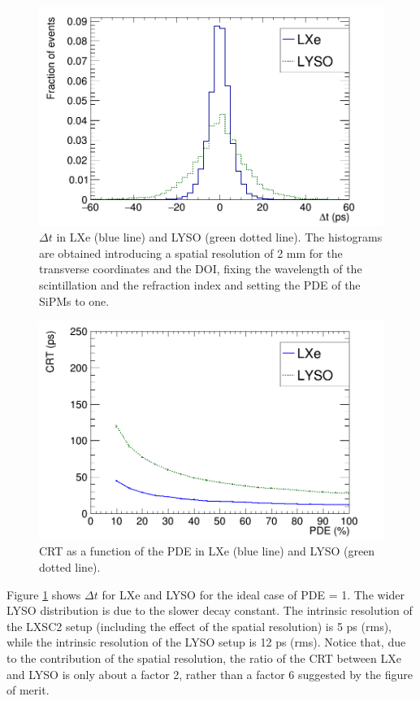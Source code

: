 \documentclass[review]{elsarticle}
\begin{document}
\begin{figure}[!bhtp]
	\centering
	\includegraphics[scale=0.4]{../img/DTOFLXeLYSO.png}
	\caption{\label{fig.dtof} $\Delta t$ in LXe (blue line) and LYSO (green dotted line). The
	histograms are obtained introducing a spatial resolution of 2 mm for the transverse coordinates and
	the DOI, fixing the wavelength of the scintillation and the refraction index and setting the PDE of the SiPMs to one. }
\end{figure}

\begin{figure}[!bhtp]
	\centering
	\includegraphics[scale=0.4]{../img/CRTvsPDELXeLYSONoJitterFstPE.png}
	\caption{\label{fig.crt1} CRT as a function of the PDE in LXe (blue line) and LYSO (green dotted line). }
\end{figure}

 Figure \ref{fig.dtof} shows $\Delta t$ for LXe and LYSO for the ideal case of PDE = 1. The wider LYSO distribution is due to the slower decay constant. The intrinsic resolution of the LXSC2 setup (including the effect of the spatial resolution) is 5 ps (rms), while the
 intrinsic resolution of the LYSO setup is 12 ps (rms). Notice that, due to the contribution of the spatial resolution, the ratio of the CRT between LXe and LYSO is only about a factor 2, rather than a factor 6 suggested by the figure of merit. 
 
\end{document}
